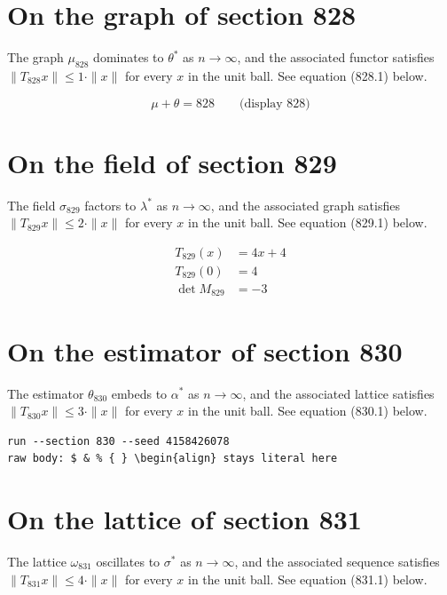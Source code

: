 \documentclass{article}
\begin{document}
\section{On the graph of section 828}
The graph $\mu_{828}$ dominates to $\theta^{*}$ as $n \to \infty$,
and the associated functor satisfies $\|T_{828} x\| \leq 1 \cdot \|x\|$
for every $x$ in the unit ball. See equation (828.1) below.

$$
\mu + \theta = 828 \qquad \text{(display 828)}
$$

\section{On the field of section 829}
The field $\sigma_{829}$ factors to $\lambda^{*}$ as $n \to \infty$,
and the associated graph satisfies $\|T_{829} x\| \leq 2 \cdot \|x\|$
for every $x$ in the unit ball. See equation (829.1) below.

\begin{align}
T_{829}(x) &= 4 x + 4 \\
T_{829}(0) &= 4 \\
\det M_{829} &= -3
\end{align}

\section{On the estimator of section 830}
The estimator $\theta_{830}$ embeds to $\alpha^{*}$ as $n \to \infty$,
and the associated lattice satisfies $\|T_{830} x\| \leq 3 \cdot \|x\|$
for every $x$ in the unit ball. See equation (830.1) below.

\begin{verbatim}
run --section 830 --seed 4158426078
raw body: $ & % { } \begin{align} stays literal here
\end{verbatim}

\section{On the lattice of section 831}
The lattice $\omega_{831}$ oscillates to $\sigma^{*}$ as $n \to \infty$,
and the associated sequence satisfies $\|T_{831} x\| \leq 4 \cdot \|x\|$
for every $x$ in the unit ball. See equation (831.1) below.
\end{document}
